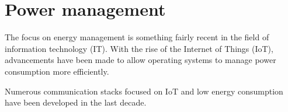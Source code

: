 \section{Power management}









The focus on energy management is something fairly recent in the field of information technology (IT).
With the rise of the Internet of Things (IoT), advancements have been made to allow operating systems to manage power consumption more efficiently.

Numerous communication stacks focused on IoT and low energy consumption have been developed in the last decade.

